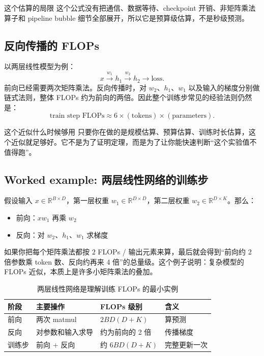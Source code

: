 \documentclass[a4paper]{article}
\begin{document}
\begin{warningbox}{这个估算的局限}
这个公式没有把通信、数据等待、checkpoint 开销、非矩阵乘法算子和 pipeline bubble 细节全部展开，所以它是预算级估算，不是秒级预测。
\end{warningbox}

\subsection{反向传播的 FLOPs}

以两层线性模型为例：
\[
x \xrightarrow{w_1} h_1 \xrightarrow{w_2} h_2 \rightarrow \text{loss}.
\]
前向已经需要两次矩阵乘法。反向传播时，对 \(w_2\)、\(h_1\)、\(w_1\) 以及输入的梯度分别做链式法则，整体 FLOPs 约为前向的两倍。因此整个训练步常见的经验法则仍然是：
\[
\text{train step FLOPs} \approx 6 \times (\text{tokens}) \times (\text{parameters}).
\]

\begin{importantbox}{这个近似什么时候够用}
只要你在做的是规模估算、预算估算、训练时长估算，这个近似就足够好。它不是为了证明定理，而是为了让你能快速判断“这个实验值不值得跑”。
\end{importantbox}

\subsection{Worked example: 两层线性网络的训练步}

假设输入 \(x\in\mathbb{R}^{B\times D}\)，第一层权重 \(w_1\in\mathbb{R}^{D\times D}\)，第二层权重 \(w_2\in\mathbb{R}^{D\times K}\)。那么：
\begin{itemize}
    \item 前向：\(xw_1\) 再乘 \(w_2\)
    \item 反向：对 \(w_2\)、\(h_1\)、\(w_1\) 求梯度
\end{itemize}

如果你把每个矩阵乘法都按 \(2\) FLOPs / 输出元素来算，最后就会得到“前向约 2 倍参数乘 token 数、反向约再来 4 倍”的总量级。这个例子说明：复杂模型的 FLOPs 近似，本质上是许多小矩阵乘法的叠加。

\begin{table}[H]
\centering
\begin{tabular}{p{}p{}p{}p{}}
\toprule
\textbf{阶段} & \textbf{主要操作} & \textbf{FLOPs 级别} & \textbf{含义} \\
\midrule
前向 & 两次 matmul & \(2BD(D+K)\) & 算预测 \\
反向 & 对参数和输入求导 & 约为前向的 2 倍 & 传播梯度 \\
训练步 & 前向 + 反向 & 约 \(6BD(D+K)\) & 完整更新一次 \\
\bottomrule
\end{tabular}
\caption{两层线性网络是理解训练 FLOPs 的最小实例}
\end{table}
\end{document}
